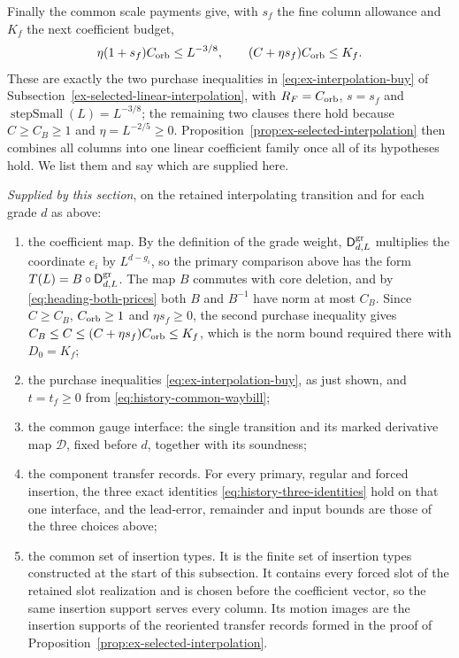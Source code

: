 Finally the common scale payments give, with $s_f$ the fine column
allowance and $K_f$ the next coefficient budget,
\[
 \eta(1+s_f)C_{\rm orb}\le L^{-3/8},\qquad
 (C+\eta s_f)C_{\rm orb}\le K_f.
\]
These are exactly the two purchase inequalities in
\eqref{eq:ex-interpolation-buy} of
Subsection~\ref{ex-selected-linear-interpolation}, with $R_F=C_{\rm orb}$, $s=s_f$ and
$\operatorname{stepSmall}(L)=L^{-3/8}$; the remaining two clauses there
hold because $C\ge C_B\ge1$ and $\eta=L^{-2/5}\ge0$.
Proposition~\ref{prop:ex-selected-interpolation} then combines all
columns into one linear coefficient family once all of its
hypotheses hold. We list them and say which are supplied here.

\emph{Supplied by this section}, on the retained interpolating
transition and for each grade $d$ as above:
\begin{enumerate}
\item[(a)] the coefficient map. By the definition of the grade weight,
      $\mathsf D^{\rm gr}_{d,L}$ multiplies the coordinate $e_i$ by
      $L^{d-g_i}$, so the primary comparison above has the form
      $T(L)=B\circ\mathsf D^{\rm gr}_{d,L}$. The map $B$ commutes with
      core deletion, and by \eqref{eq:heading-both-prices} both $B$
      and $B^{-1}$ have norm at most $C_B$. Since $C\ge C_B$,
      $C_{\rm orb}\ge1$ and $\eta s_f\ge0$, the second purchase
      inequality gives
      $C_B\le C\le(C+\eta s_f)C_{\rm orb}\le K_f$, which is the norm
      bound required there with $D_0=K_f$;
\item[(b)] the purchase inequalities \eqref{eq:ex-interpolation-buy},
      as just shown, and $t=t_f\ge0$ from
      \eqref{eq:history-common-waybill};
\item[(c)] the common gauge interface: the single transition and its
      marked derivative map $\mathcal D$, fixed before $d$, together
      with its soundness;
\item[(d)] the component transfer records. For every primary, regular and
      forced insertion, the three exact identities
      \eqref{eq:history-three-identities} hold on that one interface, and
      the lead-error, remainder and input bounds are those of the
      three choices above;
\item[(e)] the common set of insertion types. It is the finite set of insertion
      types constructed at the start of this subsection. It contains
      every forced slot of the retained slot realization and is chosen
      before the coefficient vector, so the same insertion support serves every
      column. Its motion images are the insertion supports of the reoriented
      transfer records formed in the proof of
      Proposition~\ref{prop:ex-selected-interpolation}.
\end{enumerate}

